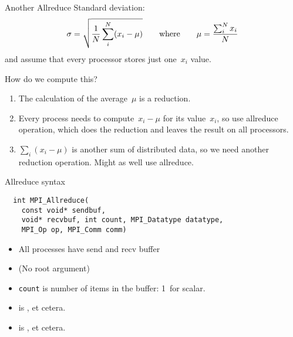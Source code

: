 \begin{numberedframe}{Another Allreduce}
Standard deviation:
\[ \sigma = \sqrt{\frac1N \sum_i^N (x_i-\mu) }
\qquad\hbox{where}\qquad \mu = \frac{\sum_i^Nx_i}N
\]
and assume that every processor stores just one~$x_i$ value.

How do we compute this?
\begin{enumerate}
\item<2-> The calculation of the average~$\mu$ is a reduction.
\item<3-> Every
  process needs to compute~$x_i-\mu$ for its value~$x_i$, so use
  allreduce operation, which does the reduction and leaves
  the result on all processors.
\item<4-> $\sum_i(x_i-\mu)$ is another sum of
  distributed data, so we need another reduction operation. Might as
  well use allreduce.
\end{enumerate}
\end{numberedframe}

\begin{numberedframe}{Allreduce syntax}
\begin{lstlisting}
  int MPI_Allreduce(
    const void* sendbuf,
    void* recvbuf, int count, MPI_Datatype datatype,
    MPI_Op op, MPI_Comm comm)  
\end{lstlisting}
\begin{itemize}
\item All processes have send and recv buffer
\item (No root argument)
\item \lstinline{count} is number of items in the buffer: 1~for scalar.
\item {} is ,  et cetera.
\item {} is ,  et cetera.
\end{itemize}
\end{numberedframe}

